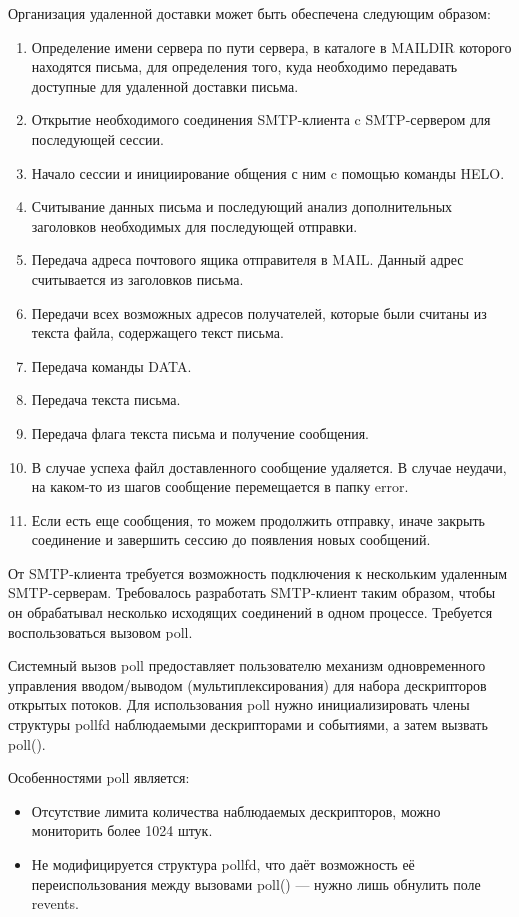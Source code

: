 \documentclass[a4paper,12pt]{report}
\begin{document}
	Организация удаленной доставки может быть обеспечена следующим образом:
	\begin{enumerate}
		\item Определение имени сервера по пути сервера, 
		в каталоге в MAILDIR которого находятся письма, 
		для определения того, куда необходимо передавать доступные для удаленной доставки письма.
		\item Открытие необходимого соединения SMTP-клиента c SMTP-сервером для последующей сессии.
		\item Начало сессии и инициирование общения с ним c помощью команды HELO.
		\item Считывание данных письма и последующий анализ дополнительных заголовков необходимых для последующей отправки.
		\item Передача адреса почтового ящика отправителя в MAIL. Данный адрес считывается из заголовков письма.
		\item Передачи всех возможных адресов получателей, которые были считаны из текста файла, содержащего текст письма.
		\item Передача команды DATA.
		\item Передача текста письма.
		\item Передача флага текста письма и получение сообщения.
		\item В случае успеха файл доставленного сообщение удаляется. 
		В случае неудачи, на каком-то из шагов сообщение перемещается в папку \/error.
		\item Если есть еще сообщения, то можем продолжить отправку, иначе закрыть соединение
		 и завершить сессию до появления новых сообщений.
	\end{enumerate}
	

	От SMTP-клиента требуется возможность подключения к нескольким удаленным SMTP-серверам.
	Требовалось разработать SMTP-клиент таким образом,
	 чтобы он обрабатывал несколько исходящих соединений в одном процессе. Требуется воспользоваться вызовом poll.

	 Системный вызов poll предоставляет пользователю механизм одновременного управления вводом/выводом (мультиплексирования) для набора дескрипторов открытых потоков. Для использования poll 
	 нужно инициализировать члены структуры pollfd наблюдаемыми дескрипторами и событиями, а затем вызвать poll().

	 Особенностями poll является:
	 \begin{itemize} 
		\item Отсутствие лимита количества наблюдаемых дескрипторов, можно мониторить более 1024 штук.
		\item Не модифицируется структура pollfd, что даёт возможность её переиспользования между вызовами poll()
	  — нужно лишь обнулить поле revents.
	\end{itemize}
\end{document}

